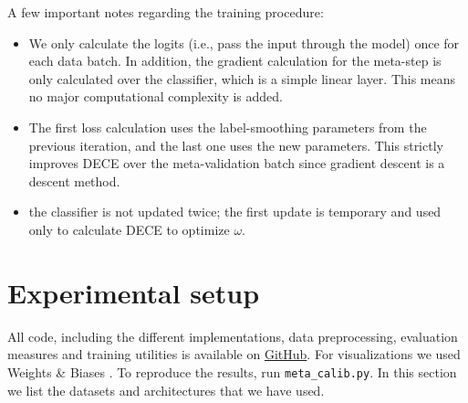 \documentclass[12pt,a4paper]{article}
\begin{document}
A few important notes regarding the training procedure:
\begin{itemize}
	\item We only calculate the logits (i.e., pass the input through the model) once for each data batch. In addition, the gradient calculation for the meta-step is only calculated over the classifier, which is a simple linear layer. This means no major computational complexity is added.
	\item The first loss calculation uses the label-smoothing parameters from the previous iteration, and the last one uses the new parameters. This strictly improves DECE over the meta-validation batch since gradient descent is a descent method.
	\item the classifier is not updated twice; the first update is temporary and used only to calculate DECE to optimize $\omega$.
\end{itemize}


\section{Experimental setup}
\label{sec:Experiments}
All code, including the different implementations, data preprocessing, evaluation measures and training utilities is available on \href{https://github.com/Rotem-BZ/MultiDomainMetaCalibration}{GitHub}. For visualizations we used Weights \& Biases \citep{wandb}. To reproduce the results, run \verb|meta_calib.py|. In this section we list the datasets and architectures that we have used.
\end{document}
